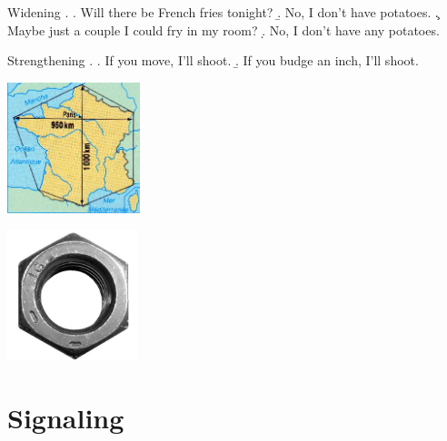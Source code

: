 \documentclass[compress]{beamer}
\begin{document}
\begin{frame}{\cite{kadmon-landman1993any}}

     \begin{block}{Widening}
     \ex. \a. Will there be French fries tonight?
	  \b. No, I don't have potatoes.
	  \c. Maybe just a couple I could fry in my room?
	  \d. No, I don't have any potatoes.

      \end{block}
      \begin{block}{Strengthening}
      \ex. \a. If you move, I'll shoot.
	   \b. If you budge an inch, I'll shoot.

      \end{block}
\end{frame}

\begin{frame}{\cite{austin1962}\footnotesize{\cite{lewis1970,landman1991,krifka1995polarity}}}
     \begin{center}
	\includegraphics[height=1.5in]{hexagon.jpg}   
     \end{center}
\end{frame}


\begin{frame}{\cite{austin1962}\footnotesize{\cite{lewis1970,landman1991,krifka1995polarity}}}
     \begin{center}
	\includegraphics[height=1.5in]{hex-nut.jpg}   
     \end{center}
\end{frame}





\section[Signaling]{Signaling}
\end{document}
